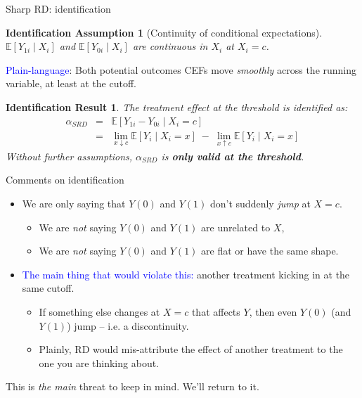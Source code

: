 \documentclass[handout,xcolor=dvipsnames]{beamer}
\newcommand\E{\mathbb{E}}
\newtheorem{iass}{Identification Assumption}
\newtheorem{ires}{Identification Result}
\begin{document}
\begin{frame}{Sharp RD: identification}
\begin{iass}[Continuity of conditional expectations]
$\E[Y_{1i} \mid X_i]$ and $\E[Y_{0i} \mid X_i]$ are continuous in $X_i$ at $X_i = c$.
\end{iass}
\medskip
{} \textcolor{Blue}{Plain-language}: Both potential outcomes CEFs move \textit{smoothly} across the running variable, at least at the cutoff.
\medskip

\begin{ires}
The treatment effect at the threshold is identified as:
\begin{eqnarray*}
\alpha_{SRD} &=& \E[Y_{1i} - Y_{0i} \mid X_i = c] \\
 &=& \lim_{x \downarrow c} \E[Y_i \mid X_i = x] \;-\; \lim_{x \uparrow c} \E[Y_i \mid X_i = x]
\end{eqnarray*}
Without further assumptions, $\alpha_{SRD}$ is \textbf{only valid at the threshold}.
\end{ires}
\end{frame}


\begin{frame}{Comments on identification}
\small
\begin{itemize}
\item<1-> We are only saying that $Y(0)$ and $Y(1)$ don't suddenly \textit{jump} at $X=c$.
\medskip
\begin{itemize}
\item<2-> We are \textit{not} saying $Y(0)$ and $Y(1)$ are unrelated to $X$, 
\item<3-> We are \textit{not} saying $Y(0)$ and $Y(1)$ are flat or have the same shape.
\end{itemize}
\medskip
\item<4-> \textcolor{Blue}{The main thing that would violate this:} another treatment kicking in at the same cutoff.
\begin{itemize}
\footnotesize
  \item If something else changes at $X=c$ that affects $Y$, then even $Y(0)$ (and $Y(1)$) jump -- i.e. a discontinuity.
  \item Plainly, RD would mis-attribute the effect of another treatment to the one you are thinking about.
\end{itemize}
\medskip
\end{itemize}
\normalsize
\begin{center} 
   This is \textit{the main} threat to keep in mind. We'll return to it.
\end{center}
\end{frame}
\end{document}
